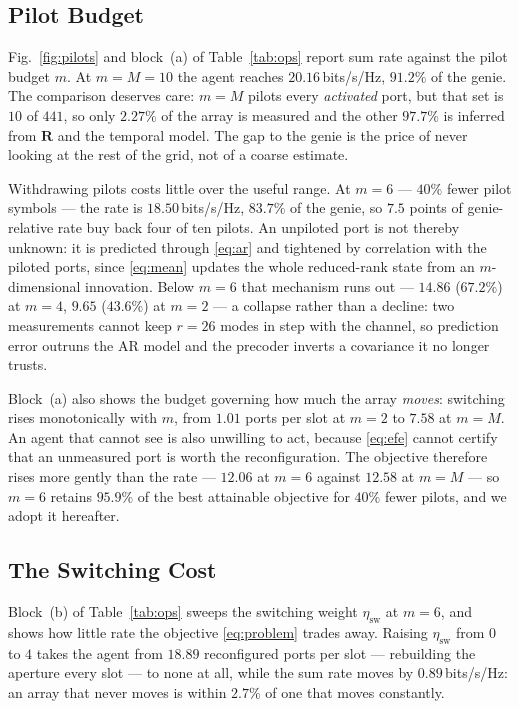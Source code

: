 \documentclass[journal]{IEEEtran}
\newcommand{\bR}{\mathbf{R}}
\begin{document}
\subsection{Pilot Budget}
Fig.~\ref{fig:pilots} and block~(a) of Table~\ref{tab:ops} report sum rate
against the pilot budget $m$. At $m=M=10$ the agent reaches
$20.16$\,bits/s/Hz, $91.2\%$ of the genie. The comparison deserves care: $m=M$
pilots every \emph{activated} port, but that set is $10$ of $441$, so only
$2.27\%$ of the array is measured and the other $97.7\%$ is inferred from $\bR$
and the temporal model. The gap to the genie is the price of never looking at
the rest of the grid, not of a coarse estimate.

Withdrawing pilots costs little over the useful range. At $m=6$ --- $40\%$
fewer pilot symbols --- the rate is $18.50$\,bits/s/Hz, $83.7\%$ of the genie,
so $7.5$ points of genie-relative rate buy back four of ten pilots. An
unpiloted port is not thereby unknown: it is predicted through \eqref{eq:ar}
and tightened by correlation with the piloted ports, since \eqref{eq:mean}
updates the whole reduced-rank state from an $m$-dimensional innovation. Below $m=6$ that mechanism runs out --- $14.86$ ($67.2\%$) at
$m=4$, $9.65$ ($43.6\%$) at $m=2$ --- a collapse rather than a decline: two
measurements cannot keep $r=26$ modes in step with the channel, so prediction
error outruns the AR model and the precoder inverts a covariance it no longer
trusts.

Block~(a) also shows the budget governing how much the array \emph{moves}:
switching rises monotonically with $m$, from $1.01$ ports per slot at $m=2$ to
$7.58$ at $m=M$. An agent that cannot see is also unwilling to act, because
\eqref{eq:efe} cannot certify that an unmeasured port is worth the
reconfiguration. The objective therefore rises more gently than the rate ---
$12.06$ at $m=6$ against $12.58$ at $m=M$ --- so $m=6$ retains $95.9\%$ of the
best attainable objective for $40\%$ fewer pilots, and we adopt it hereafter.

\subsection{The Switching Cost}
Block~(b) of Table~\ref{tab:ops} sweeps the switching weight
$\eta_{\mathrm{sw}}$ at $m=6$, and shows how little rate the objective
\eqref{eq:problem} trades away. Raising $\eta_{\mathrm{sw}}$ from $0$ to $4$ takes the agent from $18.89$
reconfigured ports per slot --- rebuilding the aperture every slot --- to none
at all, while the sum rate moves by $0.89$\,bits/s/Hz: an array that never
moves is within $2.7\%$ of one that moves constantly.
\end{document}
